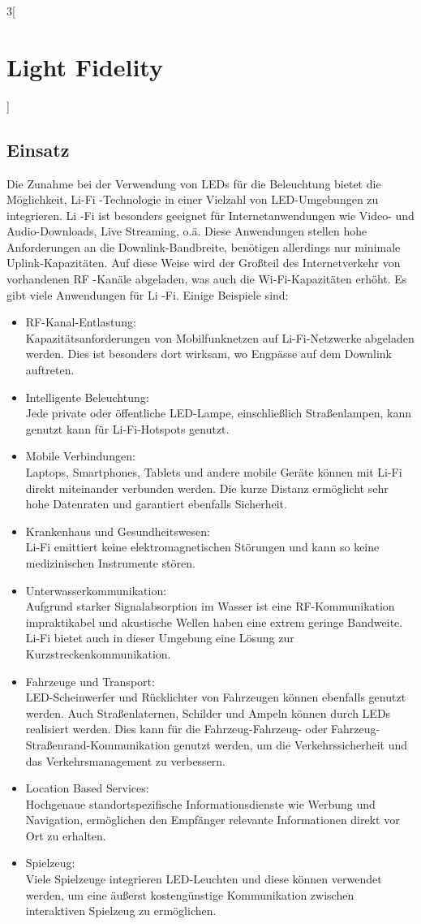 \begin{multicols}{3}[\section{Light Fidelity}]
\subsection*{Einsatz}
Die Zunahme bei der Verwendung von LEDs für die Beleuchtung bietet die Möglichkeit, Li-Fi -Technologie in einer Vielzahl von LED-Umgebungen zu integrieren.
Li -Fi ist besonders geeignet für Internetanwendungen wie Video- und Audio-Downloads, Live Streaming, o.ä. Diese Anwendungen stellen hohe Anforderungen an die Downlink-Bandbreite, benötigen allerdings nur minimale Uplink-Kapazitäten. Auf diese Weise wird der Großteil des Internetverkehr  von vorhandenen RF -Kanäle abgeladen, was auch die Wi-Fi-Kapazitäten erhöht.
Es gibt viele Anwendungen für Li -Fi. Einige Beispiele sind:
\begin{itemize}
\item RF-Kanal-Entlastung: \\
Kapazitätsanforderungen von Mobilfunknetzen   auf Li-Fi-Netzwerke abgeladen werden. Dies ist besonders dort wirksam, wo Engpässe auf dem Downlink auftreten.
\item Intelligente Beleuchtung: \\ 
Jede private oder  öffentliche LED-Lampe, einschließlich Straßenlampen, kann genutzt kann für Li-Fi-Hotspots genutzt.
\item Mobile Verbindungen: \\
Laptops, Smartphones, Tablets und andere mobile Geräte können mit Li-Fi direkt miteinander verbunden werden. Die kurze Distanz ermöglicht sehr hohe Datenraten und garantiert ebenfalls Sicherheit.
\item Krankenhaus und Gesundheitswesen: \\
Li-Fi emittiert keine elektromagnetischen Störungen und kann so keine medizinischen Instrumente stören.
\item Unterwasserkommunikation: \\ 
Aufgrund starker Signalabsorption im Wasser ist eine RF-Kommunikation impraktikabel und akustische Wellen haben eine extrem geringe Bandweite. Li-Fi bietet auch in dieser Umgebung eine Lösung zur Kurzstreckenkommunikation.
\item Fahrzeuge und Transport: \\ 
LED-Scheinwerfer und Rücklichter von Fahrzeugen können ebenfalls genutzt werden. Auch Straßenlaternen, Schilder und Ampeln können durch LEDs realisiert werden. Dies kann für die Fahrzeug-Fahrzeug- oder Fahrzeug-Straßenrand-Kommunikation genutzt werden, um die Verkehrssicherheit und das Verkehrsmanagement zu verbessern. 
\item Location Based Services: \\
Hochgenaue standortspezifische Informationsdienste wie Werbung und Navigation, ermöglichen den Empfänger  relevante Informationen direkt vor Ort zu erhalten.
\item Spielzeug: \\
Viele Spielzeuge integrieren LED-Leuchten und diese können verwendet werden, um eine äußerst kostengünstige Kommunikation zwischen interaktiven Spielzeug zu ermöglichen.
\end{itemize}


\end{multicols}
